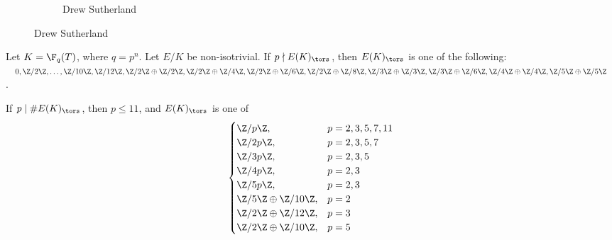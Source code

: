 \begin{frame}[plain]
\begin{figure}[h]
\begin{subfigure}{0.15\textwidth}
	\captionsetup{labelformat=empty}
	\centering
	\caption{\tiny{Drew Sutherland}}
	\end{subfigure}
	\end{figure}
\end{frame}


\begin{frame}[plain]
\end{frame}


\begin{frame}[plain]
\begin{thm}[McDonald, 2017]
Let $K= \F_q(T)$, where $q=p^n$. Let $E/K$ be non-isotrivial. If $p \nmid E(K)_\tors$, then $E(K)_\tors$ is one of the following: $0,\Z/2\Z, \ldots,\Z/10\Z,\Z/12\Z, \Z/2\Z \oplus \Z/2\Z, \Z/2\Z \oplus \Z/4\Z, \Z/2\Z \oplus \Z/6\Z, \Z/2\Z \oplus \Z/8\Z, \Z/3\Z \oplus \Z/3\Z, \Z/3\Z \oplus \Z/6\Z, \Z/4\Z \oplus \Z/4\Z, \Z/5\Z \oplus \Z/5\Z$.

If $p \mid \#E(K)_\tors$, then $p \leq 11$, and $E(K)_\tors$ is one of
	\[
	\begin{cases}
	\Z/p\Z, & p=2,3,5,7,11 \\
	\Z/2p\Z, & p=2,3,5,7 \\
	\Z/3p\Z, & p=2,3,5 \\
	\Z/4p\Z, & p=2,3 \\
	\Z/5p\Z, & p=2,3 \\
	\Z/5\Z \oplus \Z/10\Z, & p=2 \\
	\Z/2\Z \oplus \Z/12\Z, & p=3 \\
	\Z/2\Z \oplus \Z/10\Z, & p=5
	\end{cases}
	\]
\end{thm}
\end{frame}


